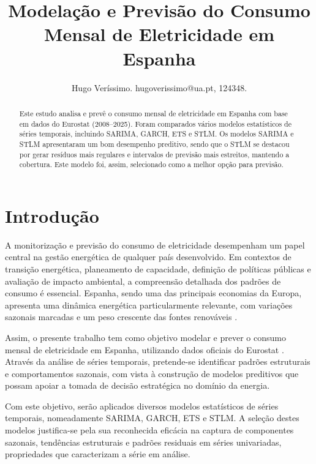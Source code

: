 \documentclass[journal]{IEEEtran}
\begin{document}
\title{Modelação e Previsão do Consumo Mensal de Eletricidade em Espanha}

\author{Hugo Veríssimo. hugoverissimo@ua.pt, 124348.}


\maketitle

\begin{abstract}
Este estudo analisa e prevê o consumo mensal de eletricidade em Espanha com base em dados do Eurostat (2008–2025). Foram comparados vários modelos estatísticos de séries temporais, incluindo SARIMA, GARCH, ETS e STLM. Os modelos SARIMA e STLM apresentaram um bom desempenho preditivo, sendo que o STLM se destacou por gerar resíduos mais regulares e intervalos de previsão mais estreitos, mantendo a cobertura. Este modelo foi, assim, selecionado como a melhor opção para previsão.
\end{abstract}

\IEEEpeerreviewmaketitle

\section{Introdução}

A monitorização e previsão do consumo de eletricidade desempenham um papel central na gestão energética de qualquer país desenvolvido. Em contextos de transição energética, planeamento de capacidade, definição de políticas públicas e avaliação de impacto ambiental, a compreensão detalhada dos padrões de consumo é essencial. Espanha, sendo uma das principais economias da Europa, apresenta uma dinâmica energética particularmente relevante, com variações sazonais marcadas e um peso crescente das fontes renováveis \cite{REE2023}.

Assim, o presente trabalho tem como objetivo modelar e prever o consumo mensal de eletricidade em Espanha, utilizando dados oficiais do Eurostat \cite{eurostat_nrg_cb_em}. Através da análise de séries temporais, pretende-se identificar padrões estruturais e comportamentos sazonais, com vista à construção de modelos preditivos que possam apoiar a tomada de decisão estratégica no domínio da energia.

Com este objetivo, serão aplicados diversos modelos estatísticos de séries temporais, nomeadamente SARIMA, GARCH, ETS e STLM. A seleção destes modelos justifica-se pela sua reconhecida eficácia na captura de componentes sazonais, tendências estruturais e padrões residuais em séries univariadas, propriedades que caracterizam a série em análise.
\end{document}
